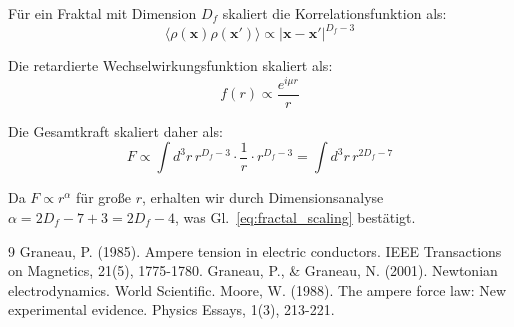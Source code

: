 	Für ein Fraktal mit Dimension $D_f$ skaliert die Korrelationsfunktion als:
	\begin{equation}
		\langle \rho(\mathbf{x}) \rho(\mathbf{x}')\rangle \propto |\mathbf{x}-\mathbf{x}'|^{D_f - 3}
	\end{equation}
	
	Die retardierte Wechselwirkungsfunktion skaliert als:
	\begin{equation}
		f(r) \propto \frac{e^{i\mu r}}{r}
	\end{equation}
	
	Die Gesamtkraft skaliert daher als:
	\begin{equation}
		F \propto \int d^3r \, r^{D_f - 3} \cdot \frac{1}{r} \cdot r^{D_f - 3} = \int d^3r \, r^{2D_f - 7}
	\end{equation}
	
	Da $F \propto r^{\alpha}$ für große $r$, erhalten wir durch Dimensionsanalyse $\alpha = 2D_f - 7 + 3 = 2D_f - 4$, was Gl.~\ref{eq:fractal_scaling} bestätigt.
	
	\begin{thebibliography}{9}
		 Graneau, P. (1985). Ampere tension in electric conductors. IEEE Transactions on Magnetics, 21(5), 1775-1780.
		 Graneau, P., \& Graneau, N. (2001). Newtonian electrodynamics. World Scientific.
		 Moore, W. (1988). The ampere force law: New experimental evidence. Physics Essays, 1(3), 213-221.
	\end{thebibliography}
	